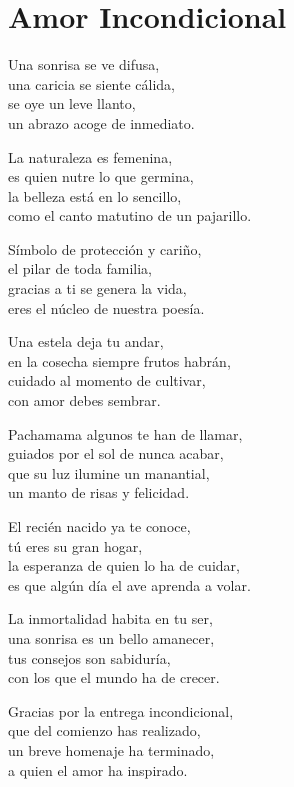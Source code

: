 \section*{Amor Incondicional}
\label{Amor_incondicional}

\vspace{1em}
\begin{center}
Una sonrisa se ve difusa,\\ 
una caricia se siente cálida,\\ 
se oye un leve llanto,\\ 
un abrazo acoge de inmediato.

\vspace{1em} 
La naturaleza es femenina,\\ 
es quien nutre lo que germina,\\ 
la belleza está en lo sencillo,\\ 
como el canto matutino de un pajarillo.

\vspace{1em} 
Símbolo de protección y cariño,\\ 
el pilar de toda familia,\\ 
gracias a ti se genera la vida,\\ 
eres el núcleo de nuestra poesía.

\vspace{1em} 
Una estela deja tu andar,\\ 
en la cosecha siempre frutos habrán,\\ 
cuidado al momento de cultivar,\\ 
con amor debes sembrar.

\vspace{1em} 
Pachamama algunos te han de llamar,\\ 
guiados por el sol de nunca acabar,\\ 
que su luz ilumine un manantial,\\ 
un manto de risas y felicidad.

\vspace{1em} 
El recién nacido ya te conoce,\\ 
tú eres su gran hogar,\\ 
la esperanza de quien lo ha de cuidar,\\ 
es que algún día el ave aprenda a volar.

\vspace{1em} 
La inmortalidad habita en tu ser,\\ 
una sonrisa es un bello amanecer,\\ 
tus consejos son sabiduría,\\ 
con los que el mundo ha de crecer.

\vspace{1em} 
Gracias por la entrega incondicional,\\ 
que del comienzo has realizado,\\ 
un breve homenaje ha terminado,\\ 
a quien el amor ha inspirado.


\end{center}




